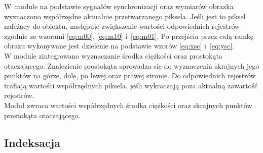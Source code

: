 W~module na podstawie sygnałów synchronizacji oraz wymiarów obrazka wyznaczono współrzędne aktualnie przetwarzanego piksela. 
Jeśli jest to piksel należący do obiektu, następuje zwiększenie wartości odpowiednich rejestrów zgodnie ze wzorami
\ref{eq:m00}, \ref{eq:m10} i~\ref{eq:m01}. 
Po przejściu przez całą ramkę obrazu wykonywane jest dzielenie na podstawie wzorów \ref{eq:xsc} i~\ref{eq:ysc}.\\

W module zintegrowano wyznaczanie środka ciężkości oraz prostokąta otaczającego. 
Znalezienie prostokąta sprowadza się do wyznaczenia skrajnych jego punktów na górze, dole, po lewej oraz prawej stronie. 
Do odpowiednich rejestrów trafiają wartości współrzędnych piksela, jeśli wykraczają poza aktualną zawartość rejestrów.\\ %
Moduł zwraca wartości współrzędnych środka ciężkości oraz skrajnych punktów prostokąta otaczającego.

\subsection{Indeksacja}
\label{subsec:indeksacja}


